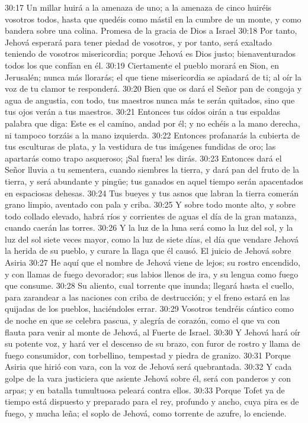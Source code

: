 30:17 Un millar huirá a la amenaza de uno; a la amenaza de cinco huiréis vosotros todos, hasta que quedéis como mástil en la cumbre de un monte, y como bandera sobre una colina. 
Promesa de la gracia de Dios a Israel 
30:18 Por tanto, Jehová esperará para tener piedad de vosotros, y por tanto, será exaltado teniendo de vosotros misericordia; porque Jehová es Dios justo; bienaventurados todos los que confían en él. 
30:19 Ciertamente el pueblo morará en Sion, en Jerusalén; nunca más llorarás; el que tiene misericordia se apiadará de ti; al oír la voz de tu clamor te responderá. 
30:20 Bien que os dará el Señor pan de congoja y agua de angustia, con todo, tus maestros nunca más te serán quitados, sino que tus ojos verán a tus maestros. 
30:21 Entonces tus oídos oirán a tus espaldas palabra que diga: Este es el camino, andad por él; y no echéis a la mano derecha, ni tampoco torzáis a la mano izquierda. 
30:22 Entonces profanarás la cubierta de tus esculturas de plata, y la vestidura de tus imágenes fundidas de oro; las apartarás como trapo asqueroso; ¡Sal fuera! les dirás. 
30:23 Entonces dará el Señor lluvia a tu sementera, cuando siembres la tierra, y dará pan del fruto de la tierra, y será abundante y pingüe; tus ganados en aquel tiempo serán apacentados en espaciosas dehesas. 
30:24 Tus bueyes y tus asnos que labran la tierra comerán grano limpio, aventado con pala y criba. 
30:25 Y sobre todo monte alto, y sobre todo collado elevado, habrá ríos y corrientes de aguas el día de la gran matanza, cuando caerán las torres. 
30:26 Y la luz de la luna será como la luz del sol, y la luz del sol siete veces mayor, como la luz de siete días, el día que vendare Jehová la herida de su pueblo, y curare la llaga que él causó. 
El juicio de Jehová sobre Asiria 
30:27 He aquí que el nombre de Jehová viene de lejos; su rostro encendido, y con llamas de fuego devorador; sus labios llenos de ira, y su lengua como fuego que consume. 
30:28 Su aliento, cual torrente que inunda; llegará hasta el cuello, para zarandear a las naciones con criba de destrucción; y el freno estará en las quijadas de los pueblos, haciéndoles errar. 
30:29 Vosotros tendréis cántico como de noche en que se celebra pascua, y alegría de corazón, como el que va con flauta para venir al monte de Jehová, al Fuerte de Israel. 
30:30 Y Jehová hará oír su potente voz, y hará ver el descenso de su brazo, con furor de rostro y llama de fuego consumidor, con torbellino, tempestad y piedra de granizo. 
30:31 Porque Asiria que hirió con vara, con la voz de Jehová será quebrantada. 
30:32 Y cada golpe de la vara justiciera que asiente Jehová sobre él, será con panderos y con arpas; y en batalla tumultuosa peleará contra ellos. 
30:33 Porque Tofet ya de tiempo está dispuesto y preparado para el rey, profundo y ancho, cuya pira es de fuego, y mucha leña; el soplo de Jehová, como torrente de azufre, lo enciende. 
